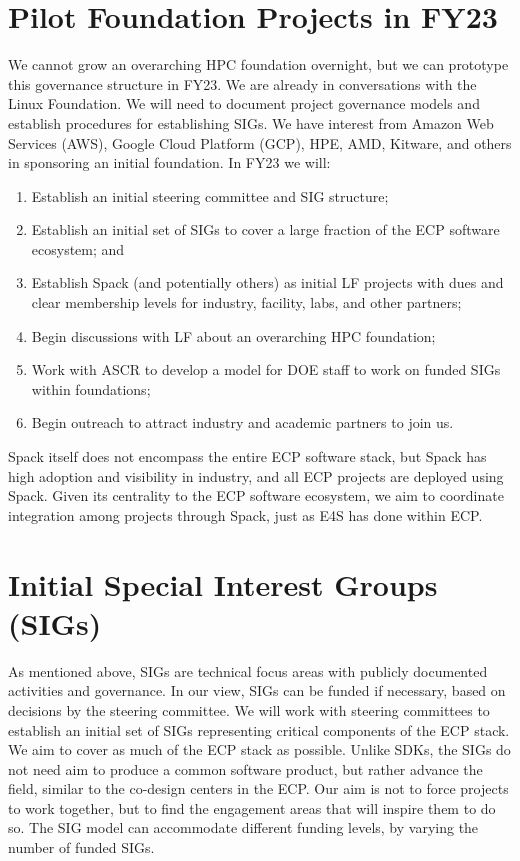 \documentclass[11pt]{article}
\begin{document}
\section{Pilot Foundation Projects in FY23}

We cannot grow an overarching HPC foundation overnight, but we can prototype this
governance structure in FY23.
We are already in conversations with the
Linux Foundation. We will need to document project governance models and establish
procedures for establishing SIGs. We have interest from Amazon Web Services (AWS),
Google Cloud Platform (GCP), HPE, AMD, Kitware, and others in sponsoring an initial
foundation. In FY23 we will:

\begin{enumerate}
\item Establish an initial steering committee and SIG structure;
\item Establish an initial set of SIGs to cover a large fraction of the ECP software
  ecosystem; and
\item Establish Spack (and potentially others) as initial LF projects with dues and
  clear membership levels for industry, facility, labs, and other partners;
\item Begin discussions with LF about an overarching HPC foundation;
\item Work with ASCR to develop a model for DOE staff to work on funded SIGs within
  foundations;
\item Begin outreach to attract industry and academic partners to join us.
\end{enumerate}

Spack itself does not encompass the entire ECP software stack, but Spack has high
adoption and visibility in industry, and all ECP projects are deployed using Spack.
Given its centrality to the ECP software ecosystem, we aim to coordinate integration
among projects through Spack, just as E4S has done within ECP. 

\section{Initial Special Interest Groups (SIGs)}

As mentioned above, SIGs are technical focus areas with publicly documented activities
and governance. In our view, SIGs can be funded if necessary, based on decisions by the
steering committee. We will work with steering committees to establish an initial set of
SIGs representing critical components of the ECP stack. We aim to cover as much of the
ECP stack as possible. Unlike SDKs, the SIGs do not need aim to produce a common
software product, but rather advance the field, similar to the co-design centers in the
ECP. Our aim is not to force projects to work together, but to find the engagement areas
that will inspire them to do so. The SIG model can accommodate different funding levels,
by varying the number of funded SIGs.
\end{document}
